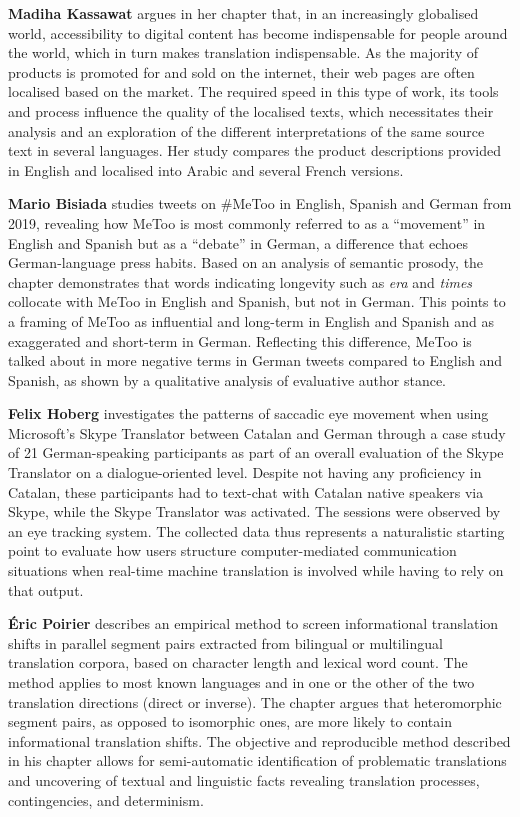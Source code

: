 \begin{refsection}
\textbf{Madiha Kassawat} argues in her chapter that, in an increasingly globalised world, accessibility to digital content has become indispensable for people around the world, which in turn makes translation indispensable. As the majority of products is promoted for and sold on the internet, their web pages are often localised based on the market. The required speed in this type of work, its tools and process influence the quality of the localised texts, which necessitates their analysis and an exploration of the different interpretations of the same source text in several languages. Her study compares the product descriptions provided in English and localised into Arabic and several French versions.

\textbf{Mario Bisiada} studies tweets on \#MeToo in English, Spanish and German from 2019, revealing how MeToo is most commonly referred to as a \enquote{movement} in English and Spanish but as a \enquote{debate} in German, a difference that echoes German-language press habits. Based on an analysis of semantic prosody, the chapter demonstrates that words indicating longevity such as \textit{era} and \textit{times} collocate with MeToo in English and Spanish, but not in German. This points to a framing of MeToo as influential and long-term in English and Spanish and as exaggerated and short-term in German. Reflecting this difference, MeToo is talked about in more negative terms in German tweets compared to English and Spanish, as shown by a qualitative analysis of evaluative author stance.

\textbf{Felix Hoberg} investigates the patterns of saccadic eye movement when using Microsoft's Skype Translator between Catalan and German through a case study of 21 German-speaking participants as part of an overall evaluation of the Skype Translator on a dialogue-oriented level. Despite not having any proficiency in Catalan, these participants had to text-chat with Catalan native speakers via Skype, while the Skype Translator was activated. The sessions were observed by an eye tracking system. The collected data thus represents a naturalistic starting point to evaluate how users structure computer-mediated communication situations when real-time machine translation is involved while having to rely on that output.

\textbf{Éric Poirier} describes an empirical method to screen informational translation shifts in parallel segment pairs extracted from bilingual or multilingual translation corpora, based on character length and lexical word count. The method applies to most known languages and in one or the other of the two translation directions (direct or inverse). The chapter argues that heteromorphic segment pairs, as opposed to isomorphic ones, are more likely to contain informational translation shifts. The objective and reproducible method described in his chapter allows for semi-automatic identification of problematic translations and uncovering of textual and linguistic facts revealing translation processes, contingencies, and determinism.


\end{refsection}
